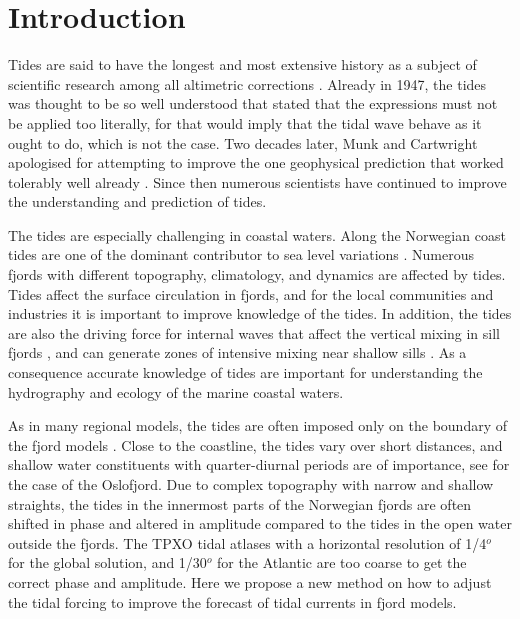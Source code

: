 \section{Introduction}

Tides are said to have the longest and most extensive history as a subject of scientific research among all altimetric corrections \cite[]{egbert94,cartwright77,hendershott81}. Already in 1947, the tides was thought to be so well understood that \cite{unna47} stated that the expressions must not be applied too literally, for that would imply that the tidal wave behave as it ought to do, which is not the case. Two decades later, Munk and Cartwright apologised for attempting to improve the one geophysical prediction that worked tolerably well already \cite[]{munk66}. Since then numerous scientists have continued to improve the understanding and prediction of tides. 

The tides are especially challenging in coastal waters. Along the Norwegian coast tides are one of the dominant contributor to sea level variations \cite[]{grabbe09}. Numerous fjords with different topography, climatology, and dynamics are affected by tides. Tides affect the surface circulation in fjords, and for the local communities and industries it is important to improve knowledge of the tides. In addition, the tides are also the driving force for internal waves that affect the vertical mixing in sill fjords \cite[]{stigeb76},
and can generate zones of intensive mixing near shallow sills \cite[]{staal15}.
As a consequence accurate knowledge of tides are important for understanding the hydrography and ecology of the marine coastal waters.

As in many regional models, the tides are often imposed only on the boundary of the fjord models \cite[]{gjevik89}. Close to the coastline, the tides vary over short distances, and shallow water constituents with quarter-diurnal periods are of importance, see \cite{trygg74} for the case of the Oslofjord. Due to complex topography with narrow and shallow straights, 
the tides in the innermost parts of the Norwegian fjords are often shifted in phase and altered in amplitude compared to the tides in the open water outside the fjords. The TPXO tidal atlases with a horizontal resolution of 1/4$^o$ for the global solution, and 1/30$^o$ for the Atlantic \cite[]{egbert94,egbert02} are too coarse to get the correct phase and amplitude. Here we propose a new method on how to adjust the tidal forcing to improve the forecast of tidal currents in fjord models. 
